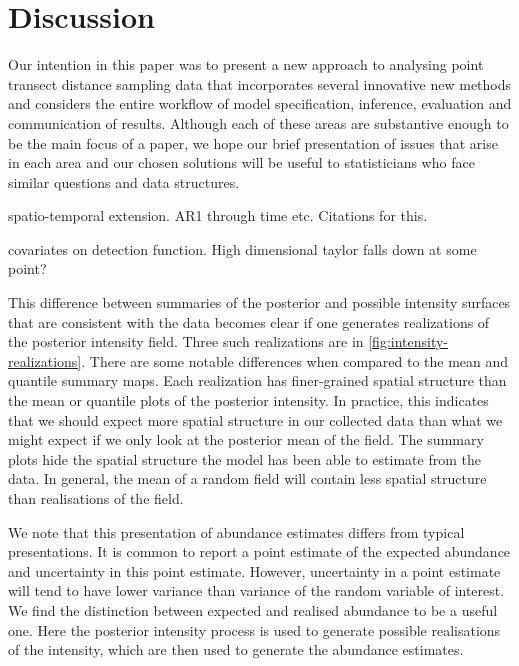 \documentclass[preprint,12pt]{elsarticle}
\begin{document}
\section{Discussion}

Our intention in this paper was to present a new approach to analysing point transect distance sampling data that incorporates several innovative new methods and considers the entire workflow of model specification, inference, evaluation and communication of results.  Although each of these areas are substantive enough to be the main focus of a paper, we hope our brief presentation of issues that arise in each area and our chosen solutions will be useful to statisticians who face similar questions and data structures.

spatio-temporal extension. AR1 through time etc.  Citations for this.

covariates on detection function.  High dimensional taylor falls down at some point?

This difference between summaries of the posterior and possible intensity surfaces that are consistent with the data becomes clear if one generates realizations of the posterior intensity field.  Three such realizations are in \autoref{fig:intensity-realizations}.  There are some notable differences when compared to the mean and quantile summary maps.  Each realization has finer-grained spatial structure than the mean or quantile plots of the posterior intensity.  In practice, this indicates that we should expect more spatial structure in our collected data than what we might expect if we only look at the posterior mean of the field.  The summary plots hide the spatial structure the model has been able to estimate from the data.  In general, the mean of a random field will contain less spatial structure than realisations of the field.


We note that this presentation of abundance estimates differs from typical presentations.  It is common to report a point estimate of the expected abundance and uncertainty in this point estimate.  However, uncertainty in a point estimate will tend to have lower variance than variance of the random variable of interest.  We find the distinction between expected and realised abundance to be a useful one. Here the posterior intensity process is used to generate possible realisations of the intensity, which are then used to generate the abundance estimates. 

\clearpage


\end{document}
